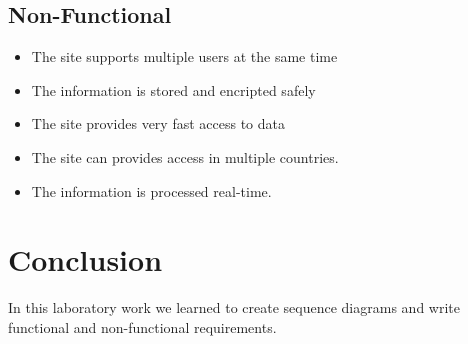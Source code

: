 \documentclass[12pt,a4paper,titlepage]{article}
\begin{document}
\subsection{Non-Functional}
\begin{itemize}
	\item The site supports multiple users at the same time
	\item The information is stored and encripted safely
	\item The site provides very fast access to data
	\item The site can provides access in multiple countries.
	\item The information is processed real-time.
\end{itemize}
\section{Conclusion}
In this laboratory work we learned to create sequence diagrams and write functional and non-functional requirements.

\clearpage
\cleardoublepage
\end{document}
